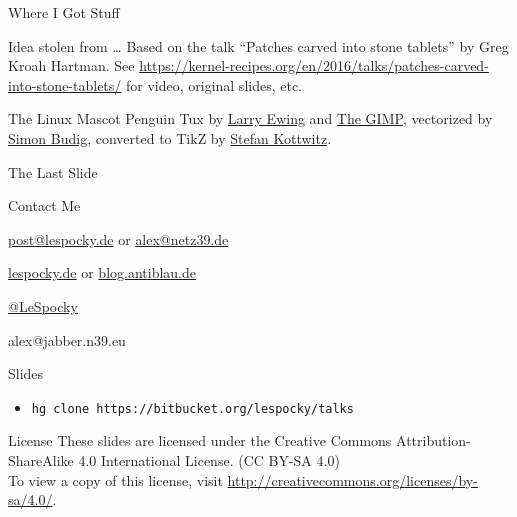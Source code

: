 \documentclass{beamer}
\begin{document}
\begin{frame}{Where I Got Stuff}
    \begin{block}{Idea stolen from …}
        Based on the talk \enquote{Patches carved into stone tablets} by
        Greg Kroah Hartman. See
        \url{https://kernel-recipes.org/en/2016/talks/patches-carved-into-stone-tablets/}
        for video, original slides, etc.
    \end{block}
    \begin{block}{The Linux Mascot}
        Penguin Tux by \href{mailto:lewing@isc.tamu.edu}{Larry Ewing}
        and \href{http://isc.tamu.edu/~lewing/linux/}{The GIMP},
        vectorized by \href{http://www.home.unix-ag.org/simon/}{Simon Budig},
        converted to TikZ by
        \href{http://www.texample.net/weblog/2012/apr/28/tux-tex-tikz/}{Stefan Kottwitz}.
    \end{block}
\end{frame}

\begin{frame}{The Last Slide}
    \begin{block}{Contact Me}
        \begin{description}[Twitter]
            \item [E-Mail] \href{mailto:post@lespocky.de}{post@lespocky.de}
                    or \href{mailto:alex@netz39.de}{alex@netz39.de}
            \item [WWW] \href{http://www.lespocky.de/}{lespocky.de} or
                    \href{http://blog.antiblau.de/}{blog.antiblau.de}
            \item [Twitter] \href{https://twitter.com/LeSpocky}{@LeSpocky}
            \item [XMPP] alex@jabber.n39.eu
        \end{description}
    \end{block}
    \begin{block}{Slides}
        \begin{itemize}
            \item \texttt{hg clone https://bitbucket.org/lespocky/talks}
        \end{itemize}
    \end{block}
    \begin{block}{License}
        These slides are licensed under the Creative Commons
        Attribution-ShareAlike 4.0 International License. (CC BY-SA 4.0) \\
        To view a copy of this license, visit
        \url{http://creativecommons.org/licenses/by-sa/4.0/}.
    \end{block}
\end{frame}
\end{document}
